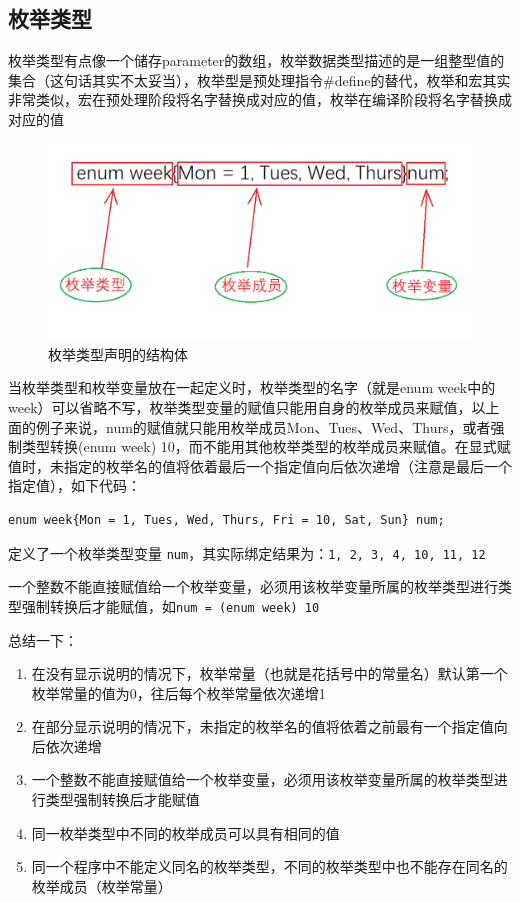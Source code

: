 \documentclass[]{report}
\begin{document}
		\subsection{枚举类型}
		枚举类型有点像一个储存parameter的数组，枚举数据类型描述的是一组整型值的集合（这句话其实不太妥当），枚举型是预处理指令\#define的替代，枚举和宏其实非常类似，宏在预处理阶段将名字替换成对应的值，枚举在编译阶段将名字替换成对应的值
		\begin{figure}[h]
			\centering
			\begin{minipage}{40em}
				\centering
				\includegraphics[scale = 0.3]{images/enum.png}
				\caption{枚举类型声明的结构体}
			\end{minipage}
		\end{figure}\par
		当枚举类型和枚举变量放在一起定义时，枚举类型的名字（就是enum week中的week）可以省略不写，枚举类型变量的赋值只能用自身的枚举成员来赋值，以上面的例子来说，num的赋值就只能用枚举成员Mon、Tues、Wed、Thurs，或者强制类型转换(enum week) 10，而不能用其他枚举类型的枚举成员来赋值。在显式赋值时，未指定的枚举名的值将依着最后一个指定值向后依次递增（注意是最后一个指定值），如下代码：\par
		\begin{lstlisting}
enum week{Mon = 1, Tues, Wed, Thurs, Fri = 10, Sat, Sun} num;
		\end{lstlisting}\par
		定义了一个枚举类型变量 \verb|num|，其实际绑定结果为：\verb|1, 2, 3, 4, 10, 11, 12|\par
		一个整数不能直接赋值给一个枚举变量，必须用该枚举变量所属的枚举类型进行类型强制转换后才能赋值，如\newline \verb|num = (enum week) 10|\par
		总结一下：
		\begin{enumerate}
			\item 在没有显示说明的情况下，枚举常量（也就是花括号中的常量名）默认第一个枚举常量的值为0，往后每个枚举常量依次递增1
			\item 在部分显示说明的情况下，未指定的枚举名的值将依着之前最有一个指定值向后依次递增
			\item 一个整数不能直接赋值给一个枚举变量，必须用该枚举变量所属的枚举类型进行类型强制转换后才能赋值
			\item 同一枚举类型中不同的枚举成员可以具有相同的值
			\item 同一个程序中不能定义同名的枚举类型，不同的枚举类型中也不能存在同名的枚举成员（枚举常量）
		\end{enumerate}
\end{document}
